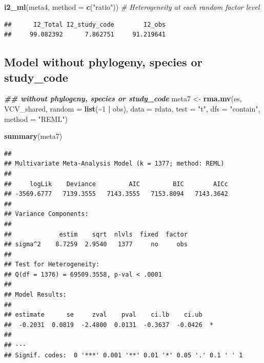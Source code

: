 \documentclass[
]{article}
\newenvironment{Shaded}{\begin{snugshade}}{\end{snugshade}}
\newcommand{\AttributeTok}[1]{\textcolor[rgb]{0.13,0.29,0.53}{#1}}
\newcommand{\CommentTok}[1]{\textcolor[rgb]{0.56,0.35,0.01}{\textit{#1}}}
\newcommand{\DecValTok}[1]{\textcolor[rgb]{0.00,0.00,0.81}{#1}}
\newcommand{\DocumentationTok}[1]{\textcolor[rgb]{0.56,0.35,0.01}{\textbf{\textit{#1}}}}
\newcommand{\FunctionTok}[1]{\textcolor[rgb]{0.13,0.29,0.53}{\textbf{#1}}}
\newcommand{\NormalTok}[1]{#1}
\newcommand{\OtherTok}[1]{\textcolor[rgb]{0.56,0.35,0.01}{#1}}
\newcommand{\SpecialCharTok}[1]{\textcolor[rgb]{0.81,0.36,0.00}{\textbf{#1}}}
\newcommand{\StringTok}[1]{\textcolor[rgb]{0.31,0.60,0.02}{#1}}
\begin{document}
\begin{Shaded}
\begin{Highlighting}[]
\FunctionTok{i2\_ml}\NormalTok{(meta4, }\AttributeTok{method =} \FunctionTok{c}\NormalTok{(}\StringTok{"ratio"}\NormalTok{))  }\CommentTok{\# Heterogeneity at each random factor level}
\end{Highlighting}
\end{Shaded}

\begin{verbatim}
##      I2_Total I2_study_code        I2_obs 
##     99.082392      7.862751     91.219641
\end{verbatim}

\newpage

\hypertarget{model-without-phylogeny-species-or-study_code}{%
\subsection{Model without phylogeny, species or
study\_code}\label{model-without-phylogeny-species-or-study_code}}

\begin{Shaded}
\begin{Highlighting}[]
\DocumentationTok{\#\# without phylogeny, species or study\_code}
\NormalTok{meta7 }\OtherTok{\textless{}{-}} \FunctionTok{rma.mv}\NormalTok{(es, VCV\_shared, }\AttributeTok{random =} \FunctionTok{list}\NormalTok{(}\SpecialCharTok{\textasciitilde{}}\DecValTok{1} \SpecialCharTok{|}\NormalTok{ obs), }\AttributeTok{data =}\NormalTok{ rdata,}
    \AttributeTok{test =} \StringTok{"t"}\NormalTok{, }\AttributeTok{dfs =} \StringTok{"contain"}\NormalTok{, }\AttributeTok{method =} \StringTok{"REML"}\NormalTok{)}
\end{Highlighting}
\end{Shaded}

\begin{Shaded}
\begin{Highlighting}[]
\FunctionTok{summary}\NormalTok{(meta7)}
\end{Highlighting}
\end{Shaded}

\begin{verbatim}
## 
## Multivariate Meta-Analysis Model (k = 1377; method: REML)
## 
##     logLik    Deviance         AIC         BIC        AICc   
## -3569.6777   7139.3555   7143.3555   7153.8094   7143.3642   
## 
## Variance Components:
## 
##             estim    sqrt  nlvls  fixed  factor 
## sigma^2    8.7259  2.9540   1377     no     obs 
## 
## Test for Heterogeneity:
## Q(df = 1376) = 69509.3558, p-val < .0001
## 
## Model Results:
## 
## estimate      se     zval    pval    ci.lb    ci.ub    
##  -0.2031  0.0819  -2.4800  0.0131  -0.3637  -0.0426  * 
## 
## ---
## Signif. codes:  0 '***' 0.001 '**' 0.01 '*' 0.05 '.' 0.1 ' ' 1
\end{verbatim}
\end{document}
